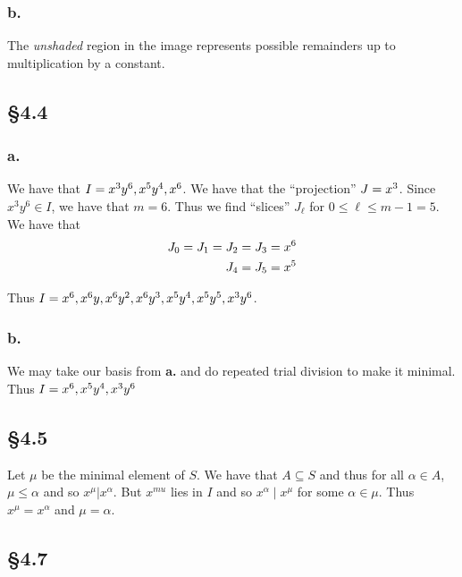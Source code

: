 \documentclass[letterpaper]{article}
\begin{document}
\subsubsection*{b.}

The \emph{unshaded} region in the image represents possible remainders up to multiplication by a constant.

\clearpage

\subsection*{\S 4.4}

\subsubsection*{a.}

We have that $I = \ideal{x^{3}y^{6}, x^{5}y^{4}, x^{6}}$.
We have that the ``projection'' $J = \gen{x^{3}}$.
Since $x^{3}y^{6} \in I$, we have that $m = 6$.
Thus we find ``slices'' $J_{\ell}$ for $0 \leq \ell \leq m - 1 = 5$.
We have that
\begin{align*}
  J_{0} = J_{1} = J_{2} = J_{3} &= \gen{x^{6}} \\
  J_{4} = J_{5} &= \ideal{x^{5}} \\
\end{align*}

Thus $I = \ideal{x^{6}, x^{6}y, x^{6}y^{2}, x^{6}y^{3}, x^{5}y^{4}, x^{5}y^{5}, x^{3}y^{6}}$.

\subsubsection*{b.}

We may take our basis from \textbf{a.} and do repeated trial division to make it minimal.
Thus $I = \ideal{x^{6}, x^{5}y^{4}, x^{3}y^{6}}$

\subsection*{\S 4.5}

Let $\mu$ be the minimal element of $S$.
We have that $A \subseteq S$ and thus for all $\alpha \in A$, $\mu \leq \alpha$ and so $x^{\mu} | x^{\alpha}$.
But $x^{mu}$ lies in $I$ and so $x^{\alpha} \mid x^{\mu}$ for some $\alpha \in \mu$.
Thus $x^{\mu} = x^{\alpha}$ and $\mu = \alpha$.

\subsection*{\S 4.7}
\end{document}
